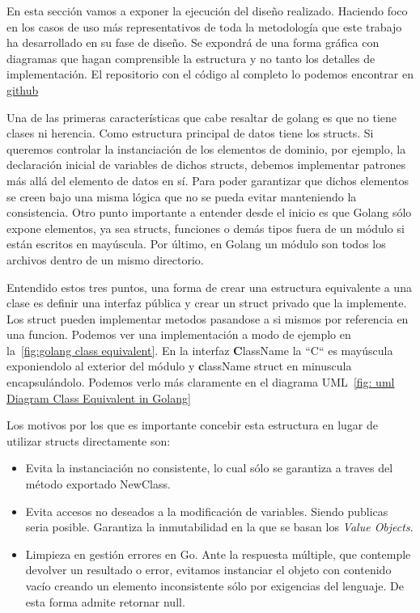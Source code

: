 
En esta sección vamos a exponer la ejecución del diseño realizado.
Haciendo foco en los casos de uso más representativos de toda la metodología que este trabajo ha desarrollado en su fase de diseño.
Se expondrá de una forma gráfica con diagramas que hagan comprensible la estructura y no tanto los detalles de implementación.
El repositorio con el código al completo lo podemos encontrar en \href{https://github.com/Enrikerf/pfm}{github}

Una de las primeras características que cabe resaltar de golang es que no tiene clases ni herencia.
Como estructura principal de datos tiene los structs.
Si queremos controlar la instanciación de los elementos de dominio, por ejemplo, la declaración inicial de variables de dichos structs, debemos implementar patrones más allá del elemento de datos en sí.
Para poder garantizar que dichos elementos se creen bajo una misma lógica que no se pueda evitar manteniendo la consistencia.
Otro punto importante a entender desde el inicio es que Golang sólo expone elementos, ya sea structs, funciones o demás tipos fuera de un módulo si están escritos en mayúscula.
Por último, en Golang un módulo son todos los archivos dentro de un mismo directorio.

Entendido estos tres puntos, una forma de crear una estructura equivalente a una clase es definir una interfaz pública y crear un struct privado que la implemente.
Los struct pueden implementar metodos pasandose a si mismos por referencia en una funcion.
Podemos ver una implementación a modo de ejemplo en la~\cref{fig:golang class equivalent}.
En la interfaz \textbf{C}lassName la “C“ es mayúscula exponiendolo al exterior del módulo y \textbf{c}lassName struct en minuscula encapsulándolo.
Podemos verlo más claramente en el diagrama UML~\cref{fig: uml Diagram Class Equivalent in Golang}

Los motivos por los que es importante concebir esta estructura en lugar de utilizar structs directamente son:

\begin{itemize}
    \item Evita la instanciación no consistente, lo cual sólo se garantiza a traves del método exportado NewClass.
    \item Evita accesos no deseados a la modificación de variables.
    Siendo publicas seria posible.
    Garantiza la inmutabilidad en la que se basan los \textit{Value Objects}.
    \item Limpieza en gestión errores en Go. Ante la respuesta múltiple, que contemple devolver un resultado o error, evitamos instanciar el objeto con contenido vacío creando un elemento inconsistente sólo por exigencias del lenguaje.
    De esta forma admite retornar null.
\end{itemize}

